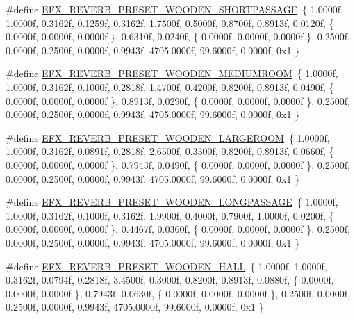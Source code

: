 \begin{DoxyCompactItemize}
\item 
\#define \hyperlink{efx-presets_8h_aa4ba95f7f7d60162ca42c2c858290472}{E\+F\+X\+\_\+\+R\+E\+V\+E\+R\+B\+\_\+\+P\+R\+E\+S\+E\+T\+\_\+\+W\+O\+O\+D\+E\+N\+\_\+\+S\+H\+O\+R\+T\+P\+A\+S\+S\+A\+GE}~\{ 1.\+0000f, 1.\+0000f, 0.\+3162f, 0.\+1259f, 0.\+3162f, 1.\+7500f, 0.\+5000f, 0.\+8700f, 0.\+8913f, 0.\+0120f, \{ 0.\+0000f, 0.\+0000f, 0.\+0000f \}, 0.\+6310f, 0.\+0240f, \{ 0.\+0000f, 0.\+0000f, 0.\+0000f \}, 0.\+2500f, 0.\+0000f, 0.\+2500f, 0.\+0000f, 0.\+9943f, 4705.\+0000f, 99.\+6000f, 0.\+0000f, 0x1 \}
\item 
\#define \hyperlink{efx-presets_8h_a0e3f257cb084f192323997f347262c64}{E\+F\+X\+\_\+\+R\+E\+V\+E\+R\+B\+\_\+\+P\+R\+E\+S\+E\+T\+\_\+\+W\+O\+O\+D\+E\+N\+\_\+\+M\+E\+D\+I\+U\+M\+R\+O\+OM}~\{ 1.\+0000f, 1.\+0000f, 0.\+3162f, 0.\+1000f, 0.\+2818f, 1.\+4700f, 0.\+4200f, 0.\+8200f, 0.\+8913f, 0.\+0490f, \{ 0.\+0000f, 0.\+0000f, 0.\+0000f \}, 0.\+8913f, 0.\+0290f, \{ 0.\+0000f, 0.\+0000f, 0.\+0000f \}, 0.\+2500f, 0.\+0000f, 0.\+2500f, 0.\+0000f, 0.\+9943f, 4705.\+0000f, 99.\+6000f, 0.\+0000f, 0x1 \}
\item 
\#define \hyperlink{efx-presets_8h_aad9a3b46b19e2f641fd3cabe2e477ab6}{E\+F\+X\+\_\+\+R\+E\+V\+E\+R\+B\+\_\+\+P\+R\+E\+S\+E\+T\+\_\+\+W\+O\+O\+D\+E\+N\+\_\+\+L\+A\+R\+G\+E\+R\+O\+OM}~\{ 1.\+0000f, 1.\+0000f, 0.\+3162f, 0.\+0891f, 0.\+2818f, 2.\+6500f, 0.\+3300f, 0.\+8200f, 0.\+8913f, 0.\+0660f, \{ 0.\+0000f, 0.\+0000f, 0.\+0000f \}, 0.\+7943f, 0.\+0490f, \{ 0.\+0000f, 0.\+0000f, 0.\+0000f \}, 0.\+2500f, 0.\+0000f, 0.\+2500f, 0.\+0000f, 0.\+9943f, 4705.\+0000f, 99.\+6000f, 0.\+0000f, 0x1 \}
\item 
\#define \hyperlink{efx-presets_8h_a18f21a9772e28cbc29f02cd7e52acff0}{E\+F\+X\+\_\+\+R\+E\+V\+E\+R\+B\+\_\+\+P\+R\+E\+S\+E\+T\+\_\+\+W\+O\+O\+D\+E\+N\+\_\+\+L\+O\+N\+G\+P\+A\+S\+S\+A\+GE}~\{ 1.\+0000f, 1.\+0000f, 0.\+3162f, 0.\+1000f, 0.\+3162f, 1.\+9900f, 0.\+4000f, 0.\+7900f, 1.\+0000f, 0.\+0200f, \{ 0.\+0000f, 0.\+0000f, 0.\+0000f \}, 0.\+4467f, 0.\+0360f, \{ 0.\+0000f, 0.\+0000f, 0.\+0000f \}, 0.\+2500f, 0.\+0000f, 0.\+2500f, 0.\+0000f, 0.\+9943f, 4705.\+0000f, 99.\+6000f, 0.\+0000f, 0x1 \}
\item 
\#define \hyperlink{efx-presets_8h_a15b475fde8954f5094393b00533d6684}{E\+F\+X\+\_\+\+R\+E\+V\+E\+R\+B\+\_\+\+P\+R\+E\+S\+E\+T\+\_\+\+W\+O\+O\+D\+E\+N\+\_\+\+H\+A\+LL}~\{ 1.\+0000f, 1.\+0000f, 0.\+3162f, 0.\+0794f, 0.\+2818f, 3.\+4500f, 0.\+3000f, 0.\+8200f, 0.\+8913f, 0.\+0880f, \{ 0.\+0000f, 0.\+0000f, 0.\+0000f \}, 0.\+7943f, 0.\+0630f, \{ 0.\+0000f, 0.\+0000f, 0.\+0000f \}, 0.\+2500f, 0.\+0000f, 0.\+2500f, 0.\+0000f, 0.\+9943f, 4705.\+0000f, 99.\+6000f, 0.\+0000f, 0x1 \}

\end{DoxyCompactItemize}
